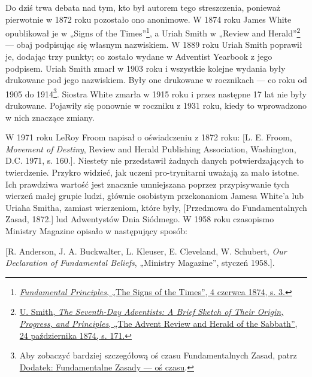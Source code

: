 Do dziś trwa debata nad tym, kto był autorem tego streszczenia, ponieważ pierwotnie w 1872 roku pozostało ono anonimowe. W 1874 roku James White opublikował je w „Signs of the Times”\footnote{\href{https://adventistdigitallibrary.org/adl-364148/signs-times-june-4-1874}{\textit{Fundamental Principles}, „The Signs of the Times”, 4 czerwca 1874, s. 3.}}, a Uriah Smith w „Review and Herald”\footnote{\href{http://documents.adventistarchives.org/Periodicals/RH/RH18741124-V44-22.pdf}{U. Smith, \textit{The Seventh-Day Adventists: A Brief Sketch of Their Origin, Progress, and Principles}, „The Advent Review and Herald of the Sabbath”, 24 października 1874, s. 171.}} — obaj podpisując się własnym nazwiskiem. W 1889 roku Uriah Smith poprawił je, dodając trzy punkty; co zostało wydane w Adventist Yearbook  z jego podpisem. Uriah Smith zmarł w 1903 roku i wszystkie kolejne wydania  były drukowane pod jego nazwiskiem. Były one drukowane w rocznikach — co roku od 1905 do 1914\footnote{Aby zobaczyć bardziej szczegółową oś czasu Fundamentalnych Zasad, patrz \hyperref[appendix:timeline]{Dodatek: Fundamentalne Zasady — oś czasu}.}. Siostra White zmarła w 1915 roku i przez następne 17 lat  nie były drukowane. Pojawiły się ponownie w roczniku z 1931 roku, kiedy to wprowadzono w nich znaczące zmiany.

W 1971 roku LeRoy Froom napisał o oświadczeniu z 1872 roku: [L. E. Froom, \textit{Movement of Destiny}, Review and Herald Publishing Association, Washington, D.C. 1971, s. 160.]. Niestety nie przedstawił żadnych danych potwierdzających to twierdzenie. Przykro widzieć, jak uczeni pro-trynitarni uważają  za mało istotne. Ich prawdziwa wartość jest znacznie umniejszana poprzez przypisywanie tych wierzeń małej grupie ludzi, głównie osobistym przekonaniom Jamesa White'a lub Uriaha Smitha, zamiast wierzeniom, które były, [Przedmowa do Fundamentalnych Zasad, 1872.] lud Adwentystów Dnia Siódmego. W 1958 roku czasopismo Ministry Magazine opisało  w następujący sposób:

[R. Anderson, J. A. Buckwalter, L. Kleuser, E. Cleveland, W. Schubert, \textit{Our Declaration of Fundamental Beliefs}, „Ministry Magazine”, styczeń 1958.].

